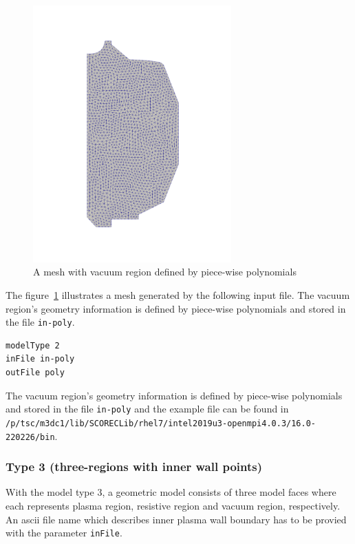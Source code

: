 \begin{figure}
\centering
\includegraphics[width=3in]{./figures/meshgen-type2.pdf}
\caption[Mesh with vacuum region defined by piece-wise polynomials]
{A mesh with vacuum region defined by piece-wise polynomials}
\label{fig:meshgen-type2}
\end{figure}

The figure~\ref{fig:meshgen-type2} illustrates a mesh generated by the following input file. The vacuum region's geometry information is defined by piece-wise polynomials and stored in the file \texttt{in-poly}. 

\begin{verbatim}
modelType 2
inFile in-poly
outFile poly
\end{verbatim}

The vacuum region's geometry information is defined by piece-wise polynomials and stored in the file \texttt{in-poly} and the example file can be found in 
\newline\newline
\texttt{/p/tsc/m3dc1/lib/SCORECLib/rhel7/intel2019u3-openmpi4.0.3/16.0-220226/bin}.

\subsubsection{Type 3 (three-regions with inner wall points)}
With the model type 3, a geometric model consists of three model faces where each represents plasma region, resistive region and vacuum region, respectively. An ascii file name which describes inner plasma wall boundary has to be provied with the parameter \texttt{inFile}.

